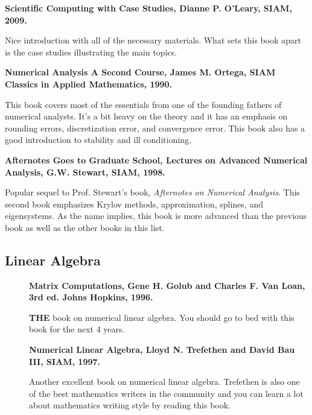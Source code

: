 \documentclass[11pt]{article}
\begin{document}
\begin{description}

\item {\bf Scientific Computing with Case Studies, Dianne P. O'Leary, SIAM, 2009.}  

Nice introduction with all of the necessary materials.  What sets this book apart is the case studies illustrating the main topics.

\item {\bf Numerical Analysis A Second Course, James M. Ortega, SIAM Classics in Applied Mathematics, 1990.} 

This book covers most of the essentials from one of the founding fathers of numerical analysts.  It's a bit heavy on the theory and it has an emphasis on rounding errors, discretization error, and convergence error.  This book also has a good introduction to stability and ill conditioning.

 \item[] {\bf Afternotes Goes to Graduate School, Lectures on Advanced Numerical Analysis, G.W. Stewart, SIAM, 1998.}  
 
Popular sequel to Prof. Stewart's book, {\it Afternotes on Numerical Analysis}.  This second book emphasizes Krylov methods, approximation, splines, and eigensystems. As the name implies, this book is more advanced than the previous book as well as the other books in this list. 

\end{description}

\subsection{Linear Algebra}
\begin{description}
\item[] {\bf Matrix Computations, Gene H. Golub and Charles F. Van Loan, 3rd ed. Johns Hopkins, 1996.}  

{\bf THE} book on numerical linear algebra.   You should go to bed with this book for the next 4 years.

\item[] {\bf Numerical Linear Algebra, Lloyd N. Trefethen and David Bau III, SIAM, 1997.} 

Another excellent book on numerical linear algebra. Trefethen is also one of the best mathematics writers in the community and you can learn a lot about mathematics writing style by reading this book.
 
\end{description}
\end{document}
